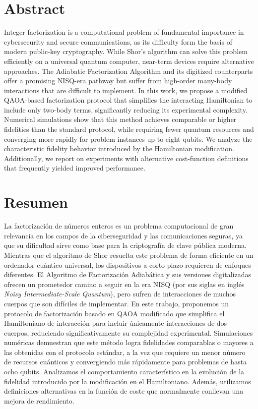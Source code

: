 \chapter*{Abstract}

Integer factorization is a computational problem of fundamental importance in cybersecurity and secure communications, as its difficulty form the basis of modern public-key cryptography. While Shor's algorithm can solve this problem efficiently on a universal quantum computer, near-term devices require alternative approaches. The Adiabatic Factorization Algorithm and its digitized counterparts offer a promising NISQ-era pathway but suffer from high-order many-body interactions that are difficult to implement. In this work, we propose a modified QAOA-based factorization protocol that simplifies the interacting Hamiltonian to include only two-body terms, significantly reducing its experimental complexity. Numerical simulations show that this method achieves comparable or higher fidelities than the standard protocol, while requiring fewer quantum resources and converging more rapidly for problem instances up to eight qubits. We analyze the characteristic fidelity behavior introduced by the Hamiltonian modification. Additionally, we report on experiments with alternative cost-function definitions that frequently yielded improved performance.

\chapter*{Resumen}

\noindent La factorización de números enteros es un problema computacional de gran relevancia en los campos de la ciberseguridad y las comunicaciones seguras, ya que su dificultad sirve como base para la criptografía de clave pública moderna. Mientras que el algoritmo de Shor resuelta este problema de forma eficiente en un ordenador cuántico universal, los dispositivos a corto plazo requieren de enfoques diferentes. El Algoritmo de Factorización Adiabática y sus versiones digitalizadas ofrecen un prometedor camino a seguir en la era NISQ (por sus siglas en inglés \textit{Noisy Intermediate-Scale Quantum}), pero sufren de interacciones de muchos cuerpos que son difíciles de implementar. En este trabajo, proponemos un protocolo de factorización basado en QAOA modificado que simplifica el Hamiltoniano de interacción para incluir únicamente interacciones de dos cuerpos, reduciendo significativamente su complejidad experimental. Simulaciones numéricas demuestran que este método logra fidelidades comparablas o mayores a las obtenidas con el protocolo estándar, a la vez que requiere un menor número de recursos cuánticos y convergiendo más rápidamente para problemas de hasta ocho qubits. Analizamos el comportamiento característico en la evolución de la fidelidad introducido por la modificación en el Hamiltoniano. Además, utilizamos definiciones alternativas en la función de coste que normalmente conllevan una mejora de rendimiento.